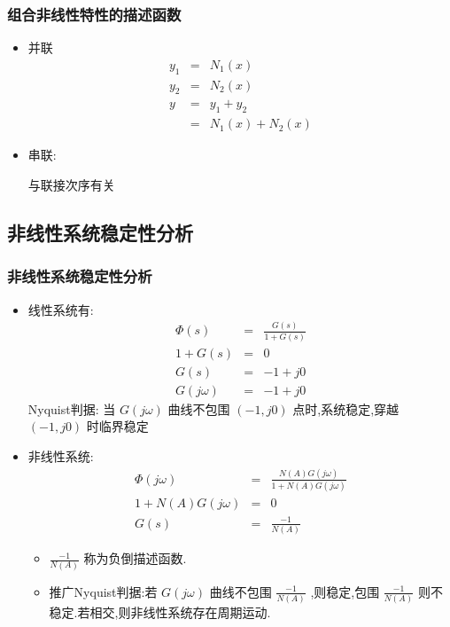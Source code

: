 \documentclass[table]{beamer}
\begin{document}
\begin{frame}
\frametitle{组合非线性特性的描述函数}
\label{sec-2-2-6}

\begin{itemize}
\item 并联
      \begin{eqnarray*}
      y_1 & = & N_1(x)\\
      y_2 &=& N_2(x) \\
      y &=& y_1+y_2 \\
       	&=& N_1(x)+N_2(x)
      \end{eqnarray*}
\item <2->串联:

      与联接次序有关
\end{itemize}
\end{frame}
\subsection{非线性系统稳定性分析}
\label{sec-2-3}
\begin{frame}
\frametitle{非线性系统稳定性分析}
\label{sec-2-3-1}
\begin{itemize}

\item 线性系统有:\\
\label{sec-2-3-1-1}%
\begin{eqnarray*}
      \Phi(s) &=& \frac{G(s)}{1+G(s)} \\
      1+G(s) &=& 0 \\
      G(s) &=& -1+j0 \\
      G(j\omega) &=& -1+j0
      \end{eqnarray*}
      Nyquist判据: 当  $G(j\omega)$ 曲线不包围 $(-1,j0)$ 点时,系统稳定,穿越 $(-1,j0)$ 时临界稳定

\item 非线性系统:\\
\label{sec-2-3-1-2}%
\begin{eqnarray*}
      \Phi(j\omega) &=& \frac{N(A)G(j\omega)}{1+N(A)G(j\omega)} \\
      1+N(A)G(j\omega) &=& 0 \\
      G(s) &=& \frac{-1}{N(A)} 
      \end{eqnarray*}
\begin{itemize}
\item $\frac{-1}{N(A)}$ 称为负倒描述函数.
\item <3-> 推广Nyquist判据:若  $G(j\omega)$  曲线不包围  $\frac{-1}{N(A)}$ ,则稳定,包围  $\frac{-1}{N(A)}$  则不稳定.若相交,则非线性系统存在周期运动.
\end{itemize}
\end{itemize} %
\end{frame}
\end{document}

